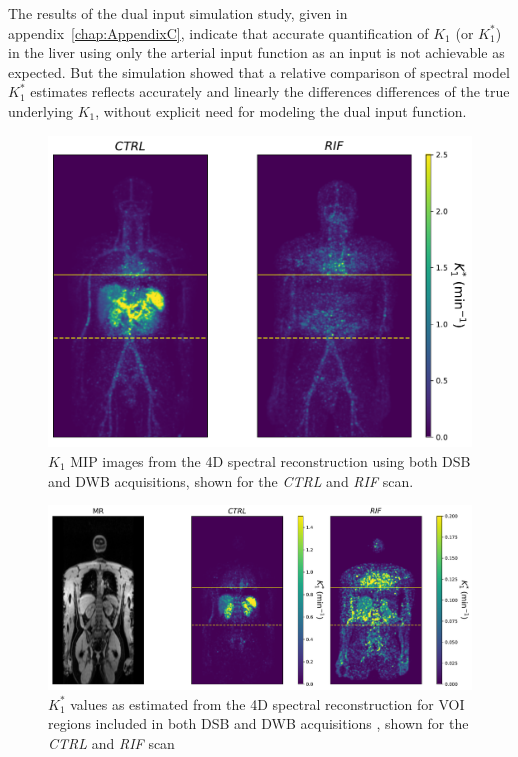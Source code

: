 The results of the dual input simulation study, given in appendix~\ref{chap:AppendixC}, indicate that accurate quantification of $K_1$ (or $K_1^{*}$) in the liver using only the arterial input function as an input is not achievable as expected. 
But the simulation showed that a relative comparison of spectral model $K_1^{*}$ estimates reflects accurately and linearly the differences differences of the true underlying $K_1$, without explicit need for modeling the dual input function.

\begin{figure} [h!]
\centering
\includegraphics[scale=0.5,angle=0]{3_Results/3_3_DWB_Reconstruction/figures/3_3_IsotoPK_K1_MIPs.pdf}
\caption{$K_1$ MIP images from the 4D spectral reconstruction using both DSB and DWB acquisitions, shown for the \textit{CTRL} and \textit{RIF} scan.}
\label{fig_3_3:IsotoPK_K1_MIP}
\end{figure} 

\begin{figure} [h!]
\centering
\includegraphics[scale=0.5,angle=0]{3_Results/3_3_DWB_Reconstruction/figures/3_3_IsotoPK_K1_SingleSlice.pdf}
\caption{$K_1^{*}$ values as estimated from the 4D spectral reconstruction for VOI regions included in both DSB and DWB acquisitions , shown for the \textit{CTRL} and \textit{RIF} scan}
\label{fig_3_3:IsotoPK_K1_SingleSlice}
\end{figure} 

